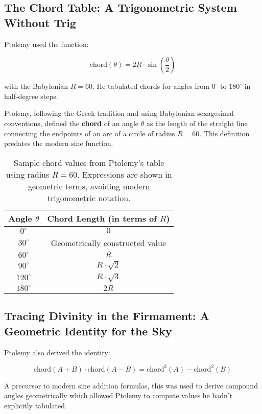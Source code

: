 \subsection{The Chord Table: A Trigonometric System Without Trig}

Ptolemy used the function:

\[
\text{chord}(\theta) = 2R \cdot \sin\left(\frac{\theta}{2}\right)
\]

with the Babylonian \( R = 60 \). He tabulated chords for angles from \( 0^\circ \) to \( 180^\circ \) in half-degree steps.

Ptolemy, following the Greek tradition and using Babylonian sexagesimal conventions, defined the \textbf{chord} of an angle \( \theta \) as the length of the straight line connecting the endpoints of an arc of a circle of radius \( R = 60 \). This definition predates the modern sine function.

\begin{table}[H]
\centering
\renewcommand{\arraystretch}{1.4}
\begin{tabular}{|c|c|}
\hline
\textbf{Angle \( \theta \)} & \textbf{Chord Length (in terms of \( R \))} \\
\hline
\( 0^\circ \) & \( 0 \) \\
\( 30^\circ \) & Geometrically constructed value \\
\( 60^\circ \) & \( R \) \\
\( 90^\circ \) & \( R \cdot \sqrt{2} \) \\
\( 120^\circ \) & \( R \cdot \sqrt{3} \) \\
\( 180^\circ \) & \( 2R \) \\
\hline
\end{tabular}
\caption{Sample chord values from Ptolemy’s table using radius \( R = 60 \). Expressions are shown in geometric terms, avoiding modern trigonometric notation.}
\end{table}


\subsection{Tracing Divinity in the Firmament: A Geometric Identity for the Sky}

Ptolemy also derived the identity:

\[
\text{chord}(A + B) \cdot \text{chord}(A - B) = \text{chord}^2(A) - \text{chord}^2(B)
\]

A precursor to modern sine addition formulas, this was used to derive compound angles geometrically which allowed Ptolemy to compute values he hadn't explicitly tabulated.

